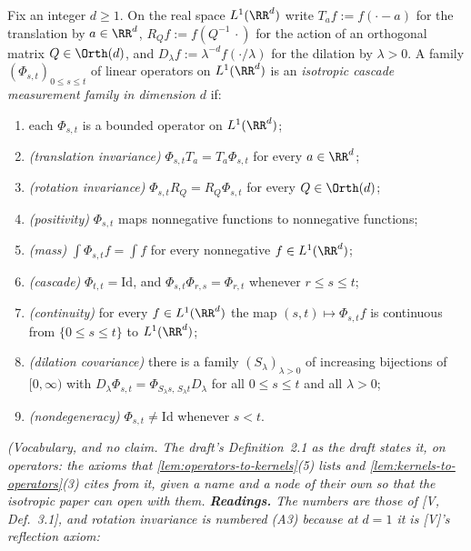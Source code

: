 \begin{definition}
\label{def:isotropic-operator-family}
\leanok
Fix an integer $d \ge 1$. On the real space $L^1(\RR^d)$ write $T_af := f(\cdot - a)$ for the
translation by $a \in \RR^d$, $R_Qf := f(Q^{-1}\,\cdot)$ for the action of an orthogonal matrix
$Q \in \Orth(d)$, and $D_\lambda f := \lambda^{-d}f(\cdot/\lambda)$ for the dilation by
$\lambda > 0$. A family $(\Phi_{s,t})_{0 \le s \le t}$ of linear operators on $L^1(\RR^d)$ is an
\emph{isotropic cascade measurement family in dimension $d$} if:
\begin{enumerate}
\item[(A1)] each $\Phi_{s,t}$ is a bounded operator on $L^1(\RR^d)$;
\item[(A2)] \emph{(translation invariance)} $\Phi_{s,t}T_a = T_a\Phi_{s,t}$ for every
$a \in \RR^d$;
\item[(A3)] \emph{(rotation invariance)} $\Phi_{s,t}R_Q = R_Q\Phi_{s,t}$ for every
$Q \in \Orth(d)$;
\item[(A4)] \emph{(positivity)} $\Phi_{s,t}$ maps nonnegative functions to nonnegative functions;
\item[(A5)] \emph{(mass)} $\int\Phi_{s,t}f = \int f$ for every nonnegative $f \in L^1(\RR^d)$;
\item[(A6)] \emph{(cascade)} $\Phi_{t,t} = \mathrm{Id}$, and $\Phi_{s,t}\Phi_{r,s} = \Phi_{r,t}$
whenever $r \le s \le t$;
\item[(A7)] \emph{(continuity)} for every $f \in L^1(\RR^d)$ the map $(s,t) \mapsto \Phi_{s,t}f$
is continuous from $\{0 \le s \le t\}$ to $L^1(\RR^d)$;
\item[(A8)] \emph{(dilation covariance)} there is a family $(S_\lambda)_{\lambda > 0}$ of
increasing bijections of $[0,\infty)$ with
$D_\lambda\Phi_{s,t} = \Phi_{S_\lambda s,\,S_\lambda t}D_\lambda$ for all $0 \le s \le t$ and all
$\lambda > 0$;
\item[(ND)] \emph{(nondegeneracy)} $\Phi_{s,t} \ne \mathrm{Id}$ whenever $s < t$.
\end{enumerate}
\statusT\quad\emph{(Vocabulary, and no claim. The draft's Definition~2.1 as the draft states it,
on operators: the axioms that \ref{lem:operators-to-kernels}(5) lists and
\ref{lem:kernels-to-operators}(3) cites from it, given a name and a node of their own so that the
isotropic paper can open with them. \textbf{Readings.} The numbers are those of [V, Def.~3.1], and
rotation invariance is numbered (A3) because at $d = 1$ it is [V]'s reflection axiom:
}
\end{definition}
